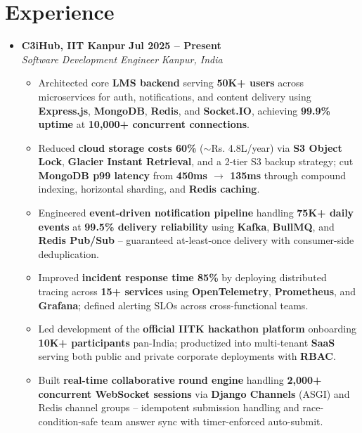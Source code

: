 \documentclass[letterpaper,10pt]{article}
\newcommand{\resumeItem}[1]{\item \small{#1}}
\newcommand{\resumeSubheading}[4]{
\item
\textbf{#1} \hfill \textbf{\small #2} \\
\textit{\small #3} \hfill \textit{\small #4}
\vspace{-4pt}
}
\begin{document}
\section{Experience}
\begin{itemize}[leftmargin=0in, label={}]

\resumeSubheading
{C3iHub, IIT Kanpur}{Jul 2025 -- Present}
{Software Development Engineer}{Kanpur, India}
\vspace{2pt}

\begin{itemize}
    \resumeItem{Architected core \textbf{LMS backend} serving \textbf{50K+ users} across microservices for auth, notifications, and content delivery using \textbf{Express.js}, \textbf{MongoDB}, \textbf{Redis}, and \textbf{Socket.IO}, achieving \textbf{99.9\% uptime} at \textbf{10,000+ concurrent connections}.}
    \resumeItem{Reduced \textbf{cloud storage costs 60\%} ($\sim$Rs. 4.8L/year) via \textbf{S3 Object Lock}, \textbf{Glacier Instant Retrieval}, and a 2-tier S3 backup strategy; cut \textbf{MongoDB p99 latency} from \textbf{450ms $\rightarrow$ 135ms} through compound indexing, horizontal sharding, and \textbf{Redis caching}.}
    \resumeItem{Engineered \textbf{event-driven notification pipeline} handling \textbf{75K+ daily events} at \textbf{99.5\% delivery reliability} using \textbf{Kafka}, \textbf{BullMQ}, and \textbf{Redis Pub/Sub} -- guaranteed at-least-once delivery with consumer-side deduplication.}
    \resumeItem{Improved \textbf{incident response time 85\%} by deploying distributed tracing across \textbf{15+ services} using \textbf{OpenTelemetry}, \textbf{Prometheus}, and \textbf{Grafana}; defined alerting SLOs across cross-functional teams.}
    \resumeItem{Led development of the \textbf{official IITK hackathon platform} onboarding \textbf{10K+ participants} pan-India; productized into multi-tenant \textbf{SaaS} serving both public and private corporate deployments with \textbf{RBAC}.}
    \resumeItem{Built \textbf{real-time collaborative round engine} handling \textbf{2,000+ concurrent WebSocket sessions} via \textbf{Django Channels} (ASGI) and Redis channel groups -- idempotent submission handling and race-condition-safe team answer sync with timer-enforced auto-submit.}
\end{itemize}


\end{itemize}
\end{document}
